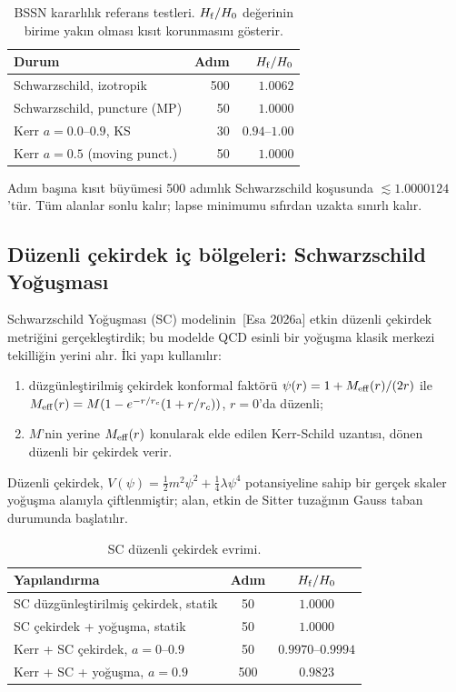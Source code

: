 \begin{table}[t]
\centering
\caption{BSSN kararlılık referans testleri. $H_{\rm f}/H_0$ değerinin
birime yakın olması kısıt korunmasını gösterir.}
\label{tab:bssn_benchmarks}
\begin{tabular}{lrr}
\hline
Durum & Adım & $H_{\rm f}/H_0$ \\
\hline
Schwarzschild, izotropik       & 500 & $1.0062$ \\
Schwarzschild, puncture (MP)   &  50 & $1.0000$ \\
Kerr $a{=}0.0$--$0.9$, KS      &  30 & $0.94$--$1.00$ \\
Kerr $a{=}0.5$ (moving punct.) &  50 & $1.0000$ \\
\hline
\end{tabular}
\end{table}

Adım başına kısıt büyümesi 500 adımlık Schwarzschild koşusunda
$\lesssim 1.0000124$'tür. Tüm alanlar sonlu kalır; lapse minimumu
sıfırdan uzakta sınırlı kalır.

\subsection{Düzenli çekirdek iç bölgeleri: Schwarzschild Yoğuşması}

Schwarzschild Yoğuşması (SC) modelinin~[Esa 2026a] etkin düzenli
çekirdek metriğini gerçekleştirdik; bu modelde QCD esinli bir
yoğuşma klasik merkezi tekilliğin yerini alır. İki yapı kullanılır:

\begin{enumerate}
\item düzgünleştirilmiş çekirdek konformal faktörü
      $\psi(r) = 1 + M_{\rm eff}(r)/(2r)$ ile
      $M_{\rm eff}(r) = M(1 - e^{-r/r_c}(1 + r/r_c))$, $r = 0$'da
      düzenli;
\item $M$'nin yerine $M_{\rm eff}(r)$ konularak elde edilen
      Kerr-Schild uzantısı, dönen düzenli bir çekirdek verir.
\end{enumerate}

Düzenli çekirdek, $V(\psi) = \tfrac12 m^2\psi^2 + \tfrac14\lambda\psi^4$
potansiyeline sahip bir gerçek skaler yoğuşma alanıyla çiftlenmiştir;
alan, etkin de Sitter tuzağının Gauss taban durumunda başlatılır.

\begin{table}[t]
\centering
\caption{SC düzenli çekirdek evrimi.}
\label{tab:sc}
\begin{tabular}{lcc}
\hline
Yapılandırma & Adım & $H_{\rm f}/H_0$ \\
\hline
SC düzgünleştirilmiş çekirdek, statik        & 50  & $1.0000$ \\
SC çekirdek + yoğuşma, statik                & 50  & $1.0000$ \\
Kerr + SC çekirdek, $a{=}0$--$0.9$           & 50  & $0.9970$--$0.9994$ \\
Kerr + SC + yoğuşma, $a{=}0.9$               & 500 & $\mathbf{0.9823}$ \\
\hline
\end{tabular}
\end{table}

